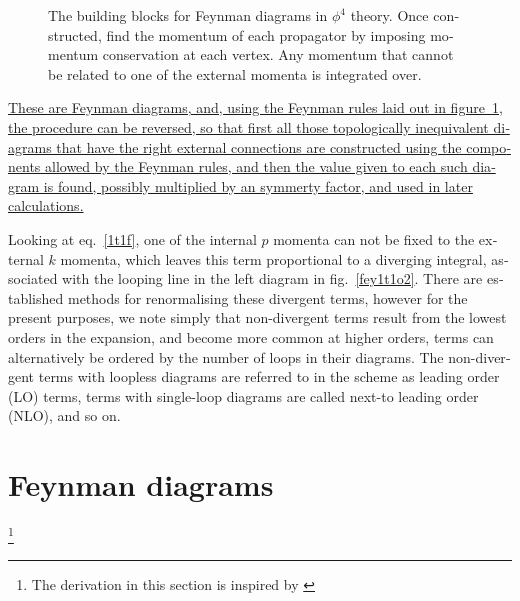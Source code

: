 \begin{english}
\begin{figure}[htb]
\hfill
{}
\hfill
{}
\hfill \phantom{d}
\caption{The building blocks for Feynman diagrams in $\phi^4$ theory. Once constructed, find the momentum of each propagator by imposing momentum conservation at each vertex. Any momentum that cannot be related to one of the external momenta is integrated over.
\label{phi4rules}}
\end{figure}

\underline{These are Feynman diagrams, and, using the Feynman rules laid out in figure~\ref{phi4rules}, the procedure can be reversed, so that first all those topologically inequivalent diagrams that have the right external connections are constructed using the components allowed by the Feynman rules, and then the value given to each such diagram is found, possibly multiplied by an symmerty factor, and used in later calculations.}

Looking at eq.~\eqref{1t1f}, one of the internal $p$ momenta can not be fixed to the external $k$ momenta, which leaves this term proportional to a diverging integral, associated with the looping line in the left diagram in fig.~\ref{fey1t1o2}. There are established methods for renormalising these divergent terms, however for the present purposes, we note simply that non-divergent terms result from the lowest orders in the expansion, and become more common at higher orders, terms can alternatively be ordered by the number of loops in their diagrams. The non-divergent terms with loopless diagrams are referred to in the scheme as leading order (LO) terms, terms with single-loop diagrams are called next-to leading order (NLO), and so on.

\section{Feynman diagrams}\footnote{The derivation in this section is inspired by \cite{wiki.feydiag}}


\end{english}
